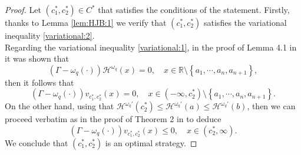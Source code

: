 \documentclass[11pt,reqno]{amsart}
\newcommand{\reals}{\mathbb{R}}
\newcommand{\cH}{\mathcal{H}}
\newcommand{\homega}{\omega_q}
\newcommand{\BRA}[1]{{{\left\{#1\right\}}}} %
\renewcommand{\leq}{\leqslant}
\begin{document}
\begin{proof}
	Let $(c_1^\ast,c_2^\ast) \in C^\ast$ that satisfies the conditions of the statement. Firstly, thanks to Lemma \ref{lem:HJB:1} we verify that $(c_1^\ast,c_2^\ast)$ satisfies the variational inequality \eqref{variational:2}.\\
	Regarding the variational inequality \eqref{variational:1}, in the proof of Lemma 4.1 in \cite{mata-renaud_2024} it was shown that
	\[
	(\Gamma - \homega(\cdot)) \cH^{\homega}(x) = 0, \quad x \in \reals\setminus\BRA{a_1,\cdots,a_n,a_{n+1}},
	\]
	then it follows that
	\[
	(\Gamma - \homega(\cdot)) v_{c_1^\ast,c_2^\ast}(x) = 0, \quad x \in (-\infty,c_2^\ast)\setminus\BRA{a_1,\cdots,a_n,a_{n+1}}.
	\]
	On the other hand, using that $\cH^{\homega\prime}(c_2^\ast) \leq \cH^{\homega\prime}(a) \leq \cH^{\homega\prime}(b)$, then we can proceed verbatim as in the proof of Theorem 2 in \cite{loeffen_2008} to deduce
	\[
	(\Gamma - \homega(\cdot)) v_{c_1^\ast,c_2^\ast}(x) \leq 0, \quad x \in (c_2^\ast,\infty).
	\]
	We conclude that $(c_1^\ast,c_2^\ast)$ is an optimal strategy.
\end{proof}
\end{document}
